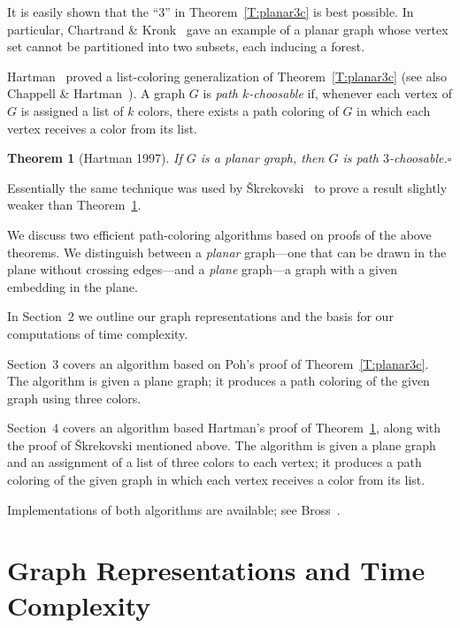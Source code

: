 \documentclass[12pt,letterpaper]{article}
\theoremstyle{plain}
\newtheorem{theorem}[lemma]{Theorem}         %
\theoremstyle{definition}
\theoremstyle{break}
\newcommand{\ggcqedsymbol}{$\square$}
\newcommand{\ggcqed}{\hbox{}\nobreak\hbox{\quad\ggcqedsymbol}}
\newcommand{\ggcnopf}{\ggcqed}
\newcommand{\defterm}[1]{\emph{#1}} %
\begin{document}
It is easily shown that the ``$3$'' in Theorem~\ref{T:planar3c}
is best possible.
In particular, Chartrand \& Kronk~\cite[Section~3]{ChKr1969}
gave an example of a planar graph whose vertex set cannot be partitioned
into two subsets, each inducing a forest.

Hartman~\cite[Thm.~4.1]{Har1997}
proved a list-coloring generalization of Theorem~\ref{T:planar3c}
(see also Chappell \& Hartman~\cite[Thm.~2.1]{ChHa2017prep}).
A graph $G$ is \defterm{path $k$-choosable} if,
whenever each vertex of $G$ is assigned a list of $k$ colors,
there exists a path coloring of $G$ in which each vertex receives
a color from its list.

\begin{theorem}[Hartman 1997]\label{T:planar3}
If $G$ is a planar graph,
then $G$ is path $3$-choosable.\ggcnopf\end{theorem}

Essentially the same technique was used by
\v{S}krekovski~\cite[Thm.~2.2b]{Skr1999}
to prove a result slightly weaker than Theorem~\ref{T:planar3}.


\medskip

We discuss two efficient path-coloring algorithms
based on proofs of the above theorems.
We distinguish between a \defterm{planar} graph---one that
can be drawn in the plane without crossing edges---and
a \defterm{plane} graph---a graph with a given embedding
in the plane.

In Section~2 we outline our graph representations
and the basis for our computations of time complexity.

Section~3 covers an algorithm
based on Poh's proof of Theorem~\ref{T:planar3c}.
The algorithm is given a plane graph;
it produces a path coloring of the given graph
using three colors.

Section~4 covers an algorithm
based Hartman's proof of Theorem~\ref{T:planar3},
along with the proof of \v{S}krekovski mentioned above.
The algorithm is given a plane graph
and an assignment of a list of three colors to each vertex;
it produces a path coloring of the given graph
in which each vertex receives a color from its list.

Implementations of both algorithms are available;
see Bross~\cite{Bro2017}.


\section{Graph Representations and Time Complexity}
\end{document}
